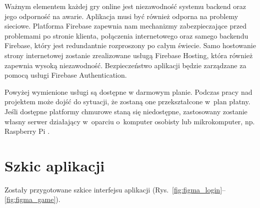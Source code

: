 Ważnym elementem każdej gry online jest niezawodność systemu
backend oraz jego odporność na awarie.
Aplikacja musi być również odporna na problemy sieciowe.
Platforma Firebase zapewnia nam mechanizmy zabezpieczające
przed problemami po stronie klienta, połączenia internetowego
oraz samego backendu Firebase, który jest redundantnie
rozproszony po całym świecie.
Samo hostowanie strony internetowej zostanie zrealizowane
usługą Firebase Hosting, która również zapewnia wysoką
niezawodność.
Bezpieczeństwo aplikacji będzie zarządzane za pomocą
usługi Firebase Authentication.

Powyżej wymienione usługi są dostępne w darmowym planie.
Podczas pracy nad projektem może dojść do sytuacji, że
zostaną one przekształcone w~plan płatny.
Jeśli dostępne platformy chmurowe staną się niedostępne,
zastosowany zostanie własny serwer działający
w~oparciu o~komputer osobisty lub mikrokomputer, np. Raspberry Pi \cite{RPi}.


\newpage

\section{Szkic aplikacji}

Zostały przygotowane szkice interfejsu aplikacji
(Rys.~\ref{fig:figma_login}--\ref{fig:figma_game}).

